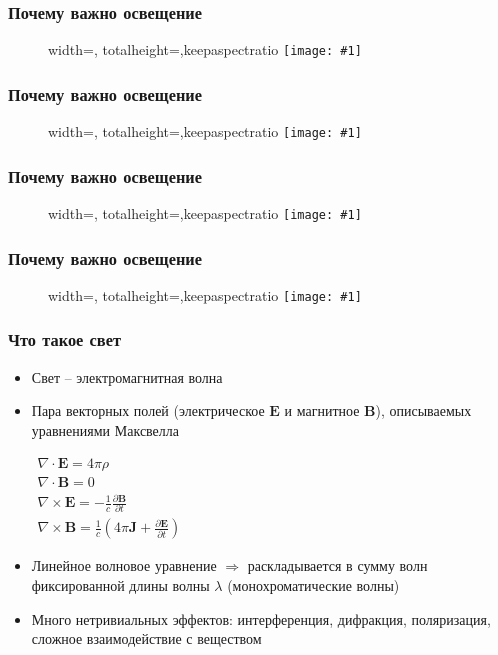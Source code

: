 \documentclass{beamer}
\newcommand{\slideimage}[1]{
  \begin{figure}
    \begin{adjustbox}{width=\textwidth, totalheight=\textheight-2\baselineskip-2\baselineskip,keepaspectratio}
      \texttt{[image: \#1]}
    \end{adjustbox}
  \end{figure}
}
\begin{document}

\begin{frame}[fragile]
\frametitle{Почему важно освещение}
\slideimage{suzanne-material.png}
\end{frame}


\begin{frame}[fragile]
\frametitle{Почему важно освещение}
\slideimage{zelda.png}
\end{frame}


\begin{frame}[fragile]
\frametitle{Почему важно освещение}
\slideimage{win31.png}
\end{frame}

\begin{frame}[fragile]
\frametitle{Почему важно освещение}
\slideimage{zelda2.jpg}
\end{frame}


\begin{frame}[fragile]
\frametitle{Что такое свет}
\begin{itemize}
\item Свет -- электромагнитная волна
\pause
\item Пара векторных полей (электрическое \begin{math}\mathbf{E}\end{math} и магнитное \begin{math}\mathbf{B}\end{math}), описываемых уравнениями Максвелла
\begin{center}
\begin{math}
\begin{matrix}
\nabla \cdot \mathbf{E} = 4 \pi \rho \\
\nabla \cdot \mathbf{B} = 0 \\
\nabla \times \mathbf{E} = -\frac{1}{c} \frac{\partial \mathbf B}{\partial t} \\
\nabla \times \mathbf{B} = \frac{1}{c} \left(4 \pi \mathbf J + \frac{\partial \mathbf E}{\partial t} \right)
\end{matrix}
\end{math}
\end{center}
\pause
\item Линейное волновое уравнение \begin{math}\Longrightarrow\end{math} раскладывается в сумму волн фиксированной длины волны \begin{math}\lambda\end{math} (монохроматические волны)
\pause
\item Много нетривиальных эффектов: интерференция, дифракция, поляризация, сложное взаимодействие с веществом
\end{itemize}
\end{frame}
\end{document}
